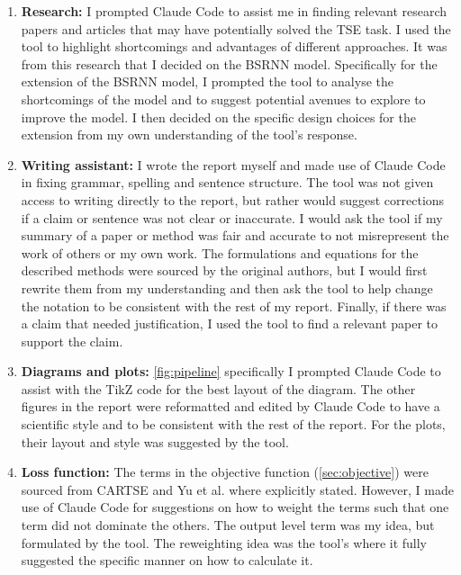 \begin{enumerate}
    \renewcommand{\theenumi}{AI\arabic{enumi}}
    \renewcommand{\theenumii}{\alph{enumii}}
    \item \label{ai:research} \textbf{Research:} I prompted Claude Code to assist me in finding relevant research papers and articles that may have potentially solved the TSE task. I used the tool to highlight shortcomings and advantages of different approaches. It was from this research that I decided on the BSRNN model. Specifically for the extension of the BSRNN model, I prompted the tool to analyse the shortcomings of the model and to suggest potential avenues to explore to improve the model. I then decided on the specific design choices for the extension from my own understanding of the tool's response.
    \item \label{ai:writing} \textbf{Writing assistant:} I wrote the report myself and made use of Claude Code in fixing grammar, spelling and sentence structure. The tool was not given access to writing directly to the report, but rather would suggest corrections if a claim or sentence was not clear or inaccurate. I would ask the tool if my summary of a paper or method was fair and accurate to not misrepresent the work of others or my own work. The formulations and equations for the described methods were sourced by the original authors, but I would first rewrite them from my understanding and then ask the tool to help change the notation to be consistent with the rest of my report. Finally, if there was a claim that needed justification, I used the tool to find a relevant paper to support the claim. 
    \item \label{ai:diagrams} \textbf{Diagrams and plots:} \autoref{fig:pipeline} specifically I prompted Claude Code to assist with the TikZ code for the best layout of the diagram. The other figures in the report were reformatted and edited by Claude Code to have a scientific style and to be consistent with the rest of the report. For the plots, their layout and style was suggested by the tool.
    \item \label{ai:loss} \textbf{Loss function:} The terms in the objective function (\autoref{sec:objective}) were sourced from CARTSE \cite{li2026cartse} and Yu et al. \cite{yu2023high} where explicitly stated. However, I made use of Claude Code for suggestions on how to weight the terms such that one term did not dominate the others. The output level term was my idea, but formulated by the tool. The reweighting idea was the tool's where it fully suggested the specific manner on how to calculate it.

\end{enumerate}
